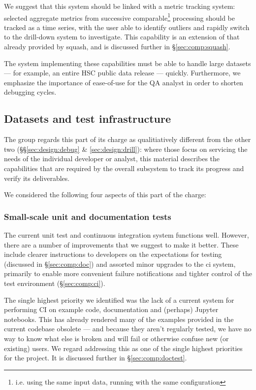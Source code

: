 We suggest that this system should be linked with a metric tracking system:
selected \glspl{aggregate metric} from successive comparable\footnote{i.e.
using the same input data, running with the same configuration} processing
should be tracked as a time series, with the user able to identify outliers
and rapidly switch to the drill-down system to investigate. This capability is
an extension of that already provided by \gls{squash}, and is discussed
further in \S\ref{sec:comp:squash}.

The system implementing these capabilities must be able to handle large
datasets --- for example, an entire HSC public data release --- quickly.
Furthermore, we emphasize the importance of ease-of-use for the QA analyst in
order to shorten debugging cycles.

\subsection{Datasets and test infrastructure}
\label{sec:design:test}

The group regards this part of its charge as qualitiatively different from the
other two (\S\S\ref{sec:design:debug} \& \ref{sec:design:drill}): where those
focus on servicing the needs of the individual developer or analyst, this
material describes the capabilities that are required by the overall subsystem
to track its progress and verify its deliverables.

We considered the following four aspects of this part of the charge:

\subsubsection{Small-scale unit and documentation tests}

The current unit test and continuous integration system functions well.
However, there are a number of improvements that we suggest to make it better.
These include clearer instructions to developers on the expectations for
testing (discussed in \S\ref{sec:comp:doc}) and assorted minor upgrades to the
\gls{ci} system, primarily to enable more convenient failure notifications and
tighter control of the test environment (\S\ref{sec:comp:ci}).

The single highest priority we identified was the lack of a current system for
performing CI on example code, documentation and (perhaps) Jupyter notebooks.
This has already rendered many of the examples provided in the current
codebase obsolete --- and because they aren't regularly tested, we have no way
to know what else is broken and will fail or otherwise confuse new (or
existing) users. We regard addressing this as one of the single highest
priorities for the project. It is discussed further in
\S\ref{sec:comp:doctest}.


